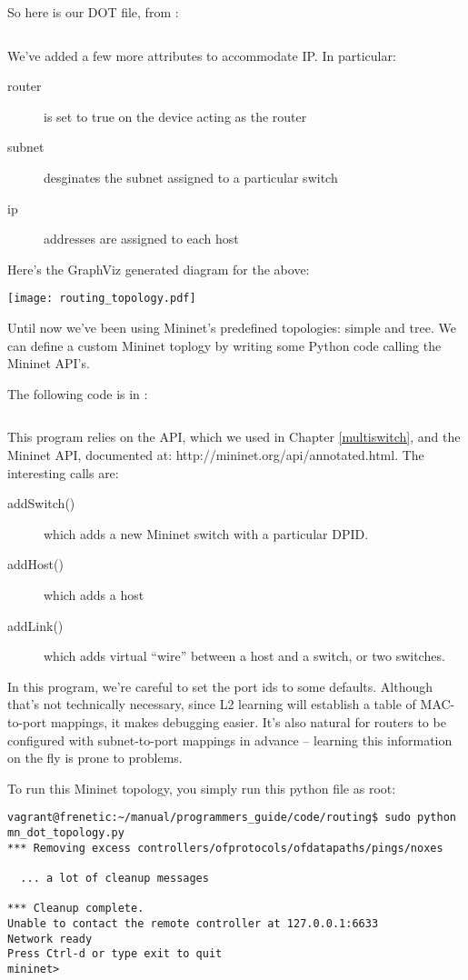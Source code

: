 So here is our DOT file, from :

\inputminted{python}{code/routing/topology.dot}

We've added a few more attributes to accommodate IP.  In particular:

\begin{description}
\item[router] is set to true on the device acting as the router
\item[subnet] desginates the subnet assigned to a particular switch
\item[ip] addresses are assigned to each host 
\end{description}

Here's the GraphViz generated diagram for the above:

\texttt{[image: routing\_topology.pdf]}

Until now we've been using Mininet's predefined topologies: simple and tree.  We
can define a custom Mininet toplogy by writing some Python code calling the Mininet
API's.  

The following code is in :

\inputminted{python}{code/routing/mn_dot_topology.py}

This program relies on the  API, which we used in Chapter \ref{multiswitch}, and 
the Mininet API, documented at: http://mininet.org/api/annotated.html.  The interesting calls are:

\begin{description}
\item[addSwitch()] which adds a new Mininet switch with a particular DPID.
\item[addHost()] which adds a host
\item[addLink()] which adds virtual ``wire'' between a host and a switch, or two switches.
\end{description}

In this program, we're careful to set the port ids to some defaults.  Although that's not
technically necessary, since L2 learning will establish a table of MAC-to-port mappings,
it makes debugging easier.  It's also natural for routers to be configured with subnet-to-port
mappings in advance -- learning this information on the fly is prone to problems.  

To run this Mininet topology, you simply run this python file as root:

\begin{verbatim}
vagrant@frenetic:~/manual/programmers_guide/code/routing$ sudo python mn_dot_topology.py
*** Removing excess controllers/ofprotocols/ofdatapaths/pings/noxes

  ... a lot of cleanup messages 

*** Cleanup complete.
Unable to contact the remote controller at 127.0.0.1:6633
Network ready
Press Ctrl-d or type exit to quit
mininet>
\end{verbatim} 


